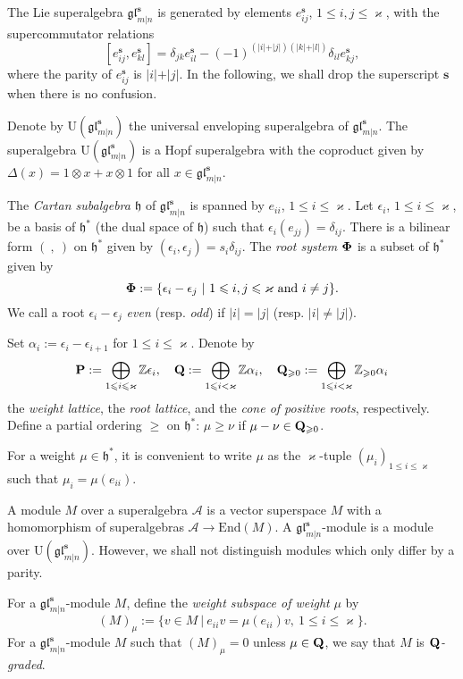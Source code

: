 \documentclass[11pt,reqno]{amsart}
\numberwithin{equation}{section}
\theoremstyle{definition}
\theoremstyle{remark}
\newcommand{\h}{\mathfrak{h}}
\newcommand{\End}{\mathrm{End}}
\newcommand{\bZ}{\mathbb{Z}}
\newcommand{\gge}{\geqslant}
\newcommand{\lle}{\leqslant}
\newcommand{\glMN}{\mathfrak{gl}_{m|n}^{\bm s}}
\newcommand{\UglMN}{\mathrm{U}(\mathfrak{gl}_{m|n}^\s)}
\newcommand{\ka}{\varkappa}
\newcommand{\s}{{\bm s}}
\begin{document}
The Lie superalgebra $\glMN$ is generated by elements $e_{ij}^\s$, $1\lle i,j\lle \ka$, with the supercommutator relations
\[
[e^\s_{ij},e^\s_{kl}]=\delta_{jk}e^\s_{il}-(-1)^{(\vert i\vert +\vert j\vert )(\vert k\vert +\vert l\vert )}\delta_{il}e^\s_{kj},
\]
where the parity of $e_{ij}^\s$ is $\vert i\vert +\vert j\vert $. In the following, we shall drop the superscript $\s$ when there is no confusion.

Denote by $\UglMN$ the universal enveloping superalgebra of $\glMN$. The superalgebra $\UglMN$ is a Hopf superalgebra with the coproduct given by $\Delta(x)=1\otimes x+x\otimes 1$ for all $x\in \glMN$.

The \textit{Cartan subalgebra $\h$} of $\glMN$ is spanned by $e_{ii}$, $1\lle i \lle \ka$. Let $\epsilon_i$, $1\lle i \lle \ka$, be a basis of $\h^*$ (the dual space of $\h$) such that $\epsilon_i(e_{jj})=\delta_{ij}$. There is a bilinear form $(\ ,\ )$ on $\h^*$ given by $(\epsilon_i,\epsilon_j)=s_i\delta_{ij}$. The \textit{root system $\bf{\Phi}$} is a subset of $\h^*$ given by
\[
{\bf \Phi}:=\{\epsilon_i-\epsilon_j~\vert ~1\lle i,j\lle \ka \text{ and }i\ne j\}.
\]
We call a root $\epsilon_i-\epsilon_j$ \textit{even} (resp. \textit{odd}) if $\vert i\vert =\vert j\vert $ (resp. $\vert i\vert \ne \vert j\vert $).

Set $\alpha_i:=\epsilon_i-\epsilon_{i+1}$ for $1\lle i \lle \ka$. Denote by
$$
{\bf P}:=\bigoplus_{1\lle i \lle \ka}\bZ \epsilon_i,\quad  {\bf Q}:=\bigoplus_{1\lle i < \ka}\bZ \alpha_i,\quad {\bf Q}_{\gge 0}:=\bigoplus_{1\lle i <\ka}\bZ_{\gge 0} \alpha_i$$ the \textit{weight lattice}, the \textit{root lattice}, and the \textit{cone of positive roots}, respectively. Define a partial ordering $\gge$ on $\h^*$: $\mu\gge \nu$ if $\mu-\nu\in {\bf Q}_{\gge 0}$. 

For a weight $\mu\in\h^*$, it is convenient to write $\mu$ as the $\ka$-tuple $(\mu_i)_{1\lle i\lle \ka}$ such that $\mu_i=\mu(e_{ii})$.

A module $M$ over a superalgebra $\mathcal A$ is a vector superspace $M$ with a homomorphism of superalgebras $\mathcal A\to \End(M)$. A $\glMN$-module is a module over $\mathrm{U}(\glMN)$. However, we shall not distinguish modules which only differ by a parity.

For a $\glMN$-module $M$, define the \textit{weight subspace of weight} $\mu$ by
\begin{equation}\label{eq:uweight-space}
(M)_{\mu}:=\{v\in M\ \vert \ e_{ii}v=\mu(e_{ii})v,\ 1\lle i \lle \ka\}.
\end{equation}
For a $\glMN$-module $M$ such that $(M)_{\mu}=0$ unless $\mu\in\bf Q$, we say that $M$ is \textit{$\bf Q$-graded}.
\end{document}
